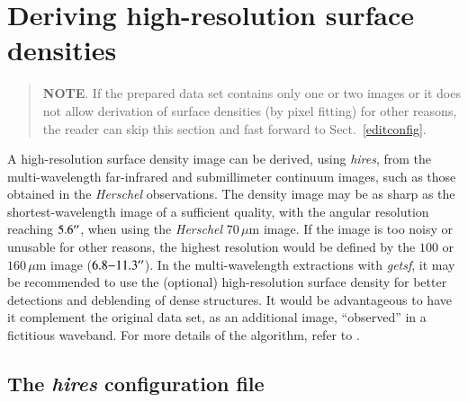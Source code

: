 \documentclass[a4paper,10pt]{article}
\newcommand*{\arcsec}{^{\prime\prime}\mkern-1.2mu}
\begin{document}

\section{Deriving high-resolution surface densities}
\label{hires}

\begin{quote} %
\textbf{NOTE}. If the prepared data set contains only one or two images or it does not allow derivation of surface densities (by
pixel fitting) for other reasons, the reader can skip this section and fast forward to Sect.~\ref{editconfig}.
\end{quote} %
A high-resolution surface density image can be derived, using \textsl{hires}, from the multi-wavelength far-infrared and
submillimeter continuum images, such as those obtained in the \emph{Herschel} observations. The density image may be as sharp as
the shortest-wavelength image of a sufficient quality, with the angular resolution reaching $5.6{\arcsec}$, when using the
\emph{Herschel} $70$\,$\mu$m image. If the image is too noisy or unusable for other reasons, the highest resolution would be
defined by the $100$ or $160$\,$\mu$m image ($6.8{-}11.3{\arcsec}$). In the multi-wavelength extractions with \textsl{getsf}, it
may be recommended to use the (optional) high-resolution surface density for better detections and deblending of dense structures.
It would be advantageous to have it complement the original data set, as an additional image, ``observed'' in a fictitious
waveband. For more details of the algorithm, refer to \cite{Men'shchikov2021getsf}.


\subsection{The \textsl{hires} configuration file}
\label{hiconfig}
\end{document}
